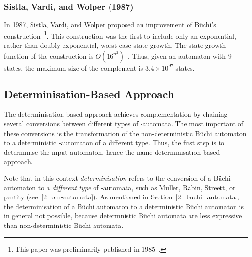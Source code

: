 
\subsubsection{Sistla, Vardi, and Wolper (1987)}
\label{2_svw87}
In 1987, Sistla, Vardi, and Wolper proposed an improvement of Büchi's construction~\cite{PrasadSistla1987217}\footnote{This paper was preliminarily published in 1985~\cite{1985_sistla}.}. This construction was the first to include only an exponential, rather than doubly-exponential, worst-case state growth. The state growth function of the construction is $O(16^{n^2})$~\cite{PrasadSistla1987217}. Thus, given an automaton with 9 states, the maximum size of the complement is $3.4 \times 10^{97}$ states. 




\subsection{Determinisation-Based Approach}
\label{2_determinisation-based}
The determinisation-based approach achieves complementation by chaining several conversions between different types of \om-automata. The most important of these conversions is the transformation of the non-deterministic Büchi automaton to a deterministic \om-automaton of a different type. Thus, the first step is to determinise the input automaton, hence the name determinisation-based approach.

Note that in this context \textit{determinisation} refers to the conversion of a Büchi automaton to a \textit{different type} of \om-automata, such as Muller, Rabin, Streett, or partity (see~\ref{2_om-automata}). As mentioned in Section~\ref{2_buchi_automata}, the determinisation of a Büchi automaton to a deterministic Büchi automaton is in general not possible, because determnistic Büchi automata are less expressive than non-deterministic Büchi automata.

